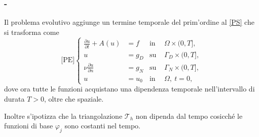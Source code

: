 \documentclass[11pt]{beamer}
\newcommand{\derP}[2]{\frac{\partial#1}{\partial#2}}
\newcommand{\teqref}[2]{\hyperref[#1]{#2}}
\begin{document}
            \begin{frame}\frametitle{\insertpart{} - \insertsection{}}
                Il problema evolutivo aggiunge un termine temporale del prim'ordine al \teqref{eqProblemaStazionario}{[PS]} che si trasforma come
                \begin{equation*}
                    \text{[PE]}
                    \left\{
                    \begin{aligned}
                        \derP ut+A(u)
                                   &=f                &\text{in }&\Omega\times(0,T],\\
                        u          &=g_D              &\text{su }&\Gamma_D\times(0,T],\\
                        \nu\derP un&=g_N              &\text{su }&\Gamma_N\times(0,T],\\
                        u&=u_0              &\text{in }&\Omega,\ t=0,
                    \end{aligned}
                    \right.
                    \label{eqProblemaEllitticoEvolutivo}
                \end{equation*}
                dove ora tutte le funzioni acquistano una dipendenza temporale nell'intervallo di durata $T>0$, oltre che spaziale.
                
                Inoltre s'ipotizza che la triangolazione $\mathcal T_h$ non dipenda dal tempo cosicché le funzioni di base $\varphi_j$ sono costanti nel tempo.
            \end{frame}
\end{document}
